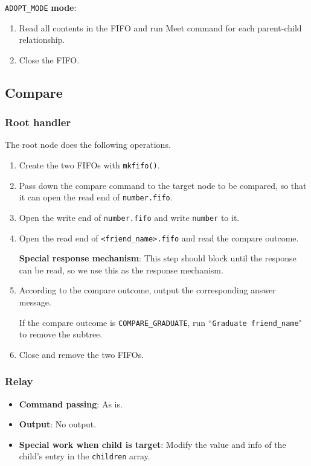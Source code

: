 \documentclass[12pt, a4paper]{article}
\begin{document}
  \medskip
  \noindent \verb|ADOPT_MODE| \textbf{mode}:
  \begin{enumerate}
    \item Read all contents in the FIFO and run Meet command for each parent-child
    relationship.
    \item Close the FIFO.
  \end{enumerate}

  \subsection{Compare}
  \subsubsection{Root handler}
  The root node does the following operations.
  \begin{enumerate}
    \item Create the two FIFOs with \verb|mkfifo()|.
    \item Pass down the compare command to the target node to be compared, so that it can
    open the read end of \verb|number.fifo|.
    \item Open the write end of \verb|number.fifo| and write \verb|number|
    to it.
    \item Open the read end of \verb|<friend_name>.fifo| and read the compare outcome.
    \par\textbf{Special response mechanism}: This step should block until the response can be
    read, so we use this as the response mechanism.
    \item According to the compare outcome, output the corresponding answer message.
    \par If the compare outcome is \verb|COMPARE_GRADUATE|, run
    ``\verb|Graduate friend_name|" to remove the subtree.
    \item Close and remove the two FIFOs.
  \end{enumerate}

  \subsubsection{Relay}
  \begin{itemize}
    \item \textbf{Command passing}: As is.
    \item \textbf{Output}: No output.
    \item \textbf{Special work when child is target}: Modify the value and info of
    the child's entry in the \verb|children| array.
  \end{itemize}
\end{document}
